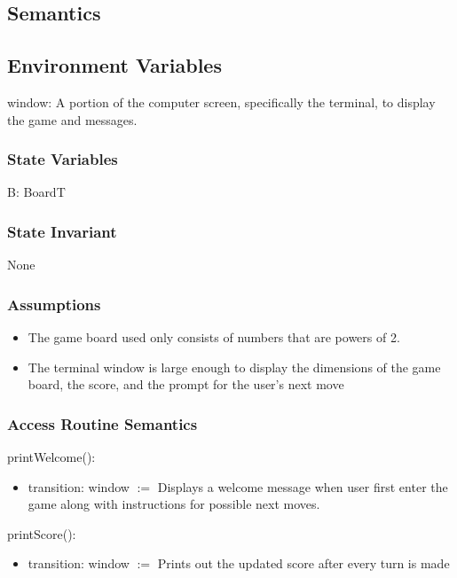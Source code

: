 \documentclass[12pt]{article}
\begin{document}
\subsection* {Semantics}

\subsection*{Environment Variables}

window: A portion of the computer screen, specifically the terminal, to display the game and messages.

\subsubsection* {State Variables}

B: BoardT

\subsubsection* {State Invariant}

None

\subsubsection* {Assumptions}

\begin{itemize}
\item The game board used only consists of numbers that are powers of 2.
\item The terminal window is large enough to display the dimensions of the game board, the score, and the prompt for the user's next move
\end{itemize}

\subsubsection* {Access Routine Semantics}

\noindent printWelcome():
\begin{itemize}
\item transition: window $:=$ Displays a welcome message when user first enter the game along with instructions for possible next moves.
\end{itemize}

\noindent printScore():
\begin{itemize}
\item transition: window $:=$ Prints out the updated score after every turn is made
\end{itemize}
\end{document}
